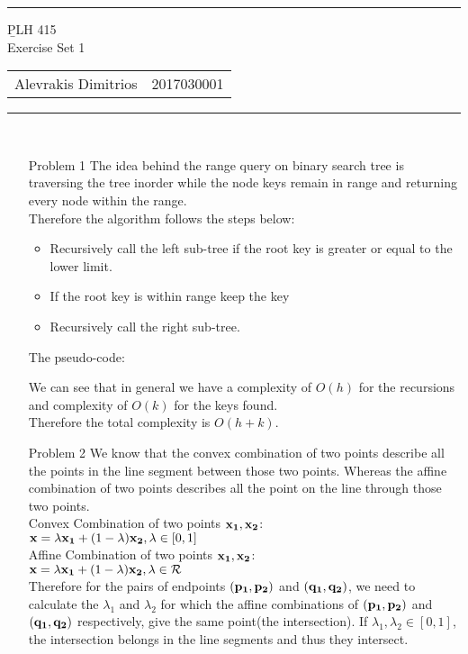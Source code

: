 \documentclass[11pt]{article}
\begin{document}
	\noindent\rule{\textwidth}{2pt}
	\begin{center}
		{\b PLH 415} \\
		Exercise Set 1\\
		\begin{tabular}{ c c }
			Alevrakis Dimitrios & 2017030001
		\end{tabular}
	\end{center}
	\rule{\textwidth}{.5pt}%
	\\
	\noindent
	\begin{enumerate}
		\item [Problem 1]
		The idea behind the range query on binary search tree is traversing the tree inorder while the node keys remain in range and returning every node within the range.\\
		Therefore the algorithm follows the steps below:\\
		\begin{itemize}
			\item Recursively call the left sub-tree if the root key is greater or equal to the lower limit.
			\item If the root key is within range keep the key
			\item Recursively call the right sub-tree.
		\end{itemize} 
		The pseudo-code:
		
		
		We can see that in general we have a complexity of $O(h)$ for the recursions and complexity of $O(k)$ for the keys found.\\
		Therefore the total complexity is $O(h+k)$.
		\item[Problem 2]
		We know that the convex combination of two points describe all the points in the line segment between those two points. Whereas the affine combination of two points describes all the point on the line through those two points.\\
		
		Convex Combination of two points ${\bf x_1},{\bf x_2}$:\\
		$\displaystyle {\bf x}=\lambda{\bf x_1} + (1-\lambda){\bf x_2},\lambda\in[0,1]$\\
		
		Affine Combination of two points ${\bf x_1},{\bf x_2}$:\\
		$\displaystyle {\bf x}=\lambda{\bf x_1} + (1-\lambda){\bf x_2},\lambda\in \mathcal{R}$\\
		
		Therefore for the pairs of endpoints $({\bf p_1},{\bf p_2})$ and $({\bf q_1},{\bf q_2})$, we need to calculate the $\lambda_1$ and $\lambda_2$ for which the affine combinations of $({\bf p_1},{\bf p_2})$ and $({\bf q_1},{\bf q_2})$ respectively, give the same point(the intersection). If $\lambda_1,\lambda_2\in[0,1]$, the intersection belongs in the line segments and thus they intersect.\\
		

\end{enumerate}
\end{document}
